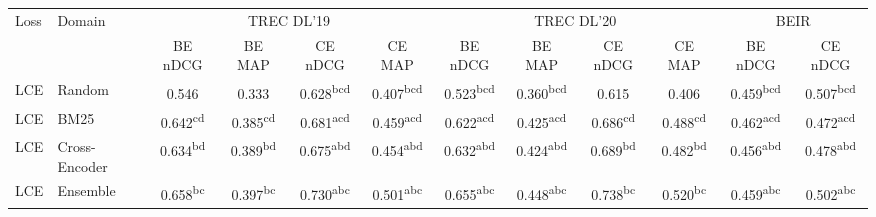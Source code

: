 \begin{table}[t]
  \centering
  \footnotesize
  \setlength{\tabcolsep}{3pt}
  \begin{tabular}{llcccccccccc}
  \toprule
    Loss & Domain & \multicolumn{4}{c}{TREC DL'19} & \multicolumn{4}{c}{TREC DL'20} & \multicolumn{2}{c}{BEIR} \\
  \cmidrule(lr){3-6}\cmidrule(lr){7-10}\cmidrule(lr){11-12}
    &  & BE nDCG & BE MAP & CE nDCG & CE MAP & BE nDCG & BE MAP & CE nDCG & CE MAP & BE nDCG & CE nDCG \\
  \midrule
  LCE & Random & 0.546\textsuperscript{\phantom{aaa}} & 0.333\textsuperscript{\phantom{aaa}} & 0.628\textsuperscript{bcd\phantom{}} & 0.407\textsuperscript{bcd\phantom{}} & 0.523\textsuperscript{bcd\phantom{}} & 0.360\textsuperscript{bcd\phantom{}} & 0.615\textsuperscript{\phantom{aaa}} & 0.406\textsuperscript{\phantom{aaa}} & 0.459\textsuperscript{bcd\phantom{}} & 0.507\textsuperscript{bcd\phantom{}} \\
  LCE & BM25 & 0.642\textsuperscript{cd\phantom{a}} & 0.385\textsuperscript{cd\phantom{a}} & 0.681\textsuperscript{acd\phantom{}} & 0.459\textsuperscript{acd\phantom{}} & 0.622\textsuperscript{acd\phantom{}} & 0.425\textsuperscript{acd\phantom{}} & 0.686\textsuperscript{cd\phantom{a}} & 0.488\textsuperscript{cd\phantom{a}} & 0.462\textsuperscript{acd\phantom{}} & 0.472\textsuperscript{acd\phantom{}} \\
  LCE & Cross-Encoder & 0.634\textsuperscript{bd\phantom{a}} & 0.389\textsuperscript{bd\phantom{a}} & 0.675\textsuperscript{abd\phantom{}} & 0.454\textsuperscript{abd\phantom{}} & 0.632\textsuperscript{abd\phantom{}} & 0.424\textsuperscript{abd\phantom{}} & 0.689\textsuperscript{bd\phantom{a}} & 0.482\textsuperscript{bd\phantom{a}} & 0.456\textsuperscript{abd\phantom{}} & 0.478\textsuperscript{abd\phantom{}} \\
  LCE & Ensemble & 0.658\textsuperscript{bc\phantom{a}} & 0.397\textsuperscript{bc\phantom{a}} & 0.730\textsuperscript{abc\phantom{}} & 0.501\textsuperscript{abc\phantom{}} & 0.655\textsuperscript{abc\phantom{}} & 0.448\textsuperscript{abc\phantom{}} & 0.738\textsuperscript{bc\phantom{a}} & 0.520\textsuperscript{bc\phantom{a}} & 0.459\textsuperscript{abc\phantom{}} & 0.502\textsuperscript{abc\phantom{}} \\

\end{tabular}
\end{table}
